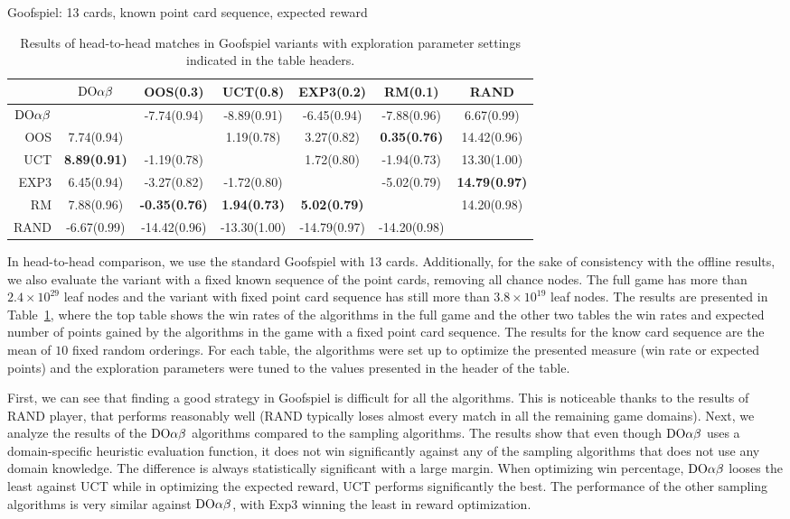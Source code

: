 \begin{table}
\begin{scriptsize}
Goofspiel: 13 cards, known point card sequence, expected reward
\begin{tabular}{|r|cccccc|}\hline
&$\textrm{DO}\alpha\beta$&OOS(0.3)&UCT(0.8)&EXP3(0.2)&RM(0.1)&RAND\\\hline
$\textrm{DO}\alpha\beta$&&-7.74(0.94)&-8.89(0.91)&-6.45(0.94)&-7.88(0.96)&6.67(0.99)\\
OOS&7.74(0.94)&&1.19(0.78)&3.27(0.82)&\textbf{0.35(0.76)}&14.42(0.96)\\
UCT&\textbf{8.89(0.91)}&-1.19(0.78)&&1.72(0.80)&-1.94(0.73)&13.30(1.00)\\
EXP3&6.45(0.94)&-3.27(0.82)&-1.72(0.80)&&-5.02(0.79)&\textbf{14.79(0.97)}\\
RM&7.88(0.96)&\textbf{-0.35(0.76)}&\textbf{1.94(0.73)}&\textbf{5.02(0.79)}&&14.20(0.98)\\
RAND&-6.67(0.99)&-14.42(0.96)&-13.30(1.00)&-14.79(0.97)&-14.20(0.98)&\\
\hline
\end{tabular}
\end{scriptsize}
\caption{Results of head-to-head matches in Goofspiel variants with exploration parameter settings indicated in the table headers.}\label{fig:matches:goof}
\end{table}

In head-to-head comparison, we use the standard Goofspiel with 13 cards. Additionally, for the sake of consistency with the offline results, we also evaluate the variant with a fixed known sequence of the point cards, removing all chance nodes. The full game has more than $2.4\times 10^{29}$ leaf nodes and the variant with fixed point card sequence has still more than $3.8\times 10^{19}$ leaf nodes. The results are presented in Table~\ref{fig:matches:goof}, where the top table shows the win rates of the algorithms in the full game and the other two tables the win rates and expected number of points gained by the algorithms in the game with a fixed point card sequence. The results for the know card sequence are the mean of $10$ fixed random orderings. For each table, the algorithms were set up to optimize the presented measure (\ie win rate or expected points) and the exploration parameters were tuned to the values presented in the header of the table.

First, we can see that finding a good strategy in Goofspiel is difficult for all the algorithms.
This is noticeable thanks to the results of RAND player, that performs reasonably well
(RAND typically loses almost every match in all the remaining game domains).
Next, we analyze the results of the $\textrm{DO}\alpha\beta$ algorithms compared to the sampling algorithms.
The results show that even though $\textrm{DO}\alpha\beta$ uses a domain-specific heuristic evaluation function, it does not win significantly against any of the sampling algorithms that does not use any domain knowledge.
The difference is always statistically significant with a large margin.
When optimizing win percentage, $\textrm{DO}\alpha\beta$ looses the least against UCT while in optimizing the expected reward, UCT performs significantly the best.
The performance of the other sampling algorithms is very similar against $\textrm{DO}\alpha\beta$, with Exp3 winning the least in reward optimization.

